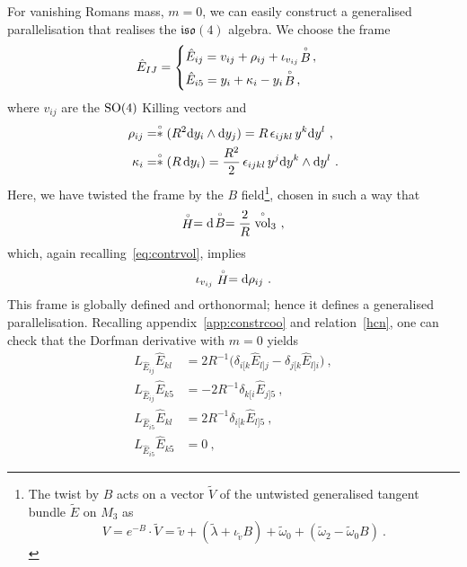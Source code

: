\documentclass[debug]{phd}
\begin{document}
				For vanishing Romans mass, $m=0$, we can easily construct a generalised parallelisation that realises the $\mathfrak{iso}(4)$ algebra.
				We choose the frame
						\begin{equation}\label{parall_S3_meq0}
									\hat{E}_{IJ} = \begin{cases} \hat{E}_{ij} = v_{ij} + \rho_{ij} + \iota_{v_{ij}}\!\stackrel{\scriptscriptstyle{\circ}}{B} \, ,\\[1mm]
										\hat{E}_{i5} = y_i + \kappa_i - y_i \!\stackrel{\scriptscriptstyle{\circ}}{B}\, , \end{cases} 
						\end{equation}
				where $v_{ij}$ are the $\mathrm{SO}(4)$ Killing vectors and
							\begin{equation}
								\begin{split}
									\rho_{ij} &= \stackrel{\scriptscriptstyle{\circ}}{*}(R^2 \mathrm{d} y_i\wedge \mathrm{d} y_j) = R\, \epsilon_{ijkl}\, y^k\mathrm{d} y^l \ , \\
									\kappa_{i} &= \stackrel{\scriptscriptstyle{\circ}}{*}(R\, \mathrm{d} y_i) = \frac{R^2}{2}\,\epsilon_{ijkl}\, y^j \mathrm{d} y^k \wedge \mathrm{d} y^l\ .
								\end{split}
							\end{equation}
				Here, we have twisted the frame by the $B$ field\footnote{%
					The twist by $B$ acts on a vector $\tilde V$ of the untwisted generalised tangent bundle $\tilde E$ on $M_3$ as
							\begin{equation*}
								V = e^{-B}\cdot \tilde V = \tilde v + (\tilde \lambda + \iota_{\tilde v} B) + \tilde \omega_0 + (\tilde \omega_2 -\tilde \omega_0 B)\ .
							\end{equation*}
						},
				chosen in such a way that
						\begin{equation}\label{HproptoVol_3}
								\stackrel{\scriptscriptstyle{\circ}}{H} = \mathrm{d} \!\stackrel{\scriptscriptstyle{\circ}}{B_{}}  = \frac{2}{R} \stackrel{\scriptscriptstyle{\circ}}{\operatorname{vol}}_3\ , 
							\end{equation}
				which, again recalling~\eqref{eq:contrvol}, implies
							\begin{equation}\label{hcn}
								\iota_{v_{ij}} \rg{H} = \dd\rho_{ij}\ .
							\end{equation}
				This frame is globally defined and orthonormal; hence it defines a generalised parallelisation.
				Recalling appendix~\ref{app:constrcoo} and relation~\eqref{hcn}, one can check that the Dorfman derivative with $m=0$ yields
							\begin{equation}\label{ISO4-alg}
								\begin{split}
									L_{\hat{E}_{ij}}\hat{E}_{kl} &= 2R^{-1}\big(\delta_{i[k}\hat{E}_{l]j} - \delta_{j[k}\hat{E}_{l]i} \big)\ ,\\
									L_{\hat{E}_{ij}}\hat{E}_{k5} &= -2R^{-1}\delta_{k[i}\hat{E}_{j]5} \ ,\\
									L_{\hat{E}_{i5}}\hat{E}_{kl} &= 2R^{-1}\delta_{i[k}\hat{E}_{l]5}\ , \\
									L_{\hat{E}_{i5}}\hat{E}_{k5} &= 0\ , 
								\end{split}
							\end{equation}
\end{document}
